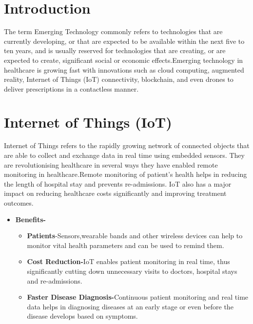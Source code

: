 \documentclass[12pt]{article}
\begin{document}
\section*{Introduction}

The term Emerging Technology commonly refers to technologies that are currently developing, or that are expected to be available within the next five to ten years, and is usually reserved for technologies that are creating, or are expected to create, significant social or economic effects.Emerging technology in healthcare is growing fast with innovations such as cloud computing, augmented reality, Internet of Things (IoT) connectivity, blockchain, and even drones to deliver prescriptions in a contactless manner.


\section{Internet of Things (IoT)}

Internet of Things refers to the rapidly growing network of connected objects that are able to collect and exchange data in real time using embedded sensors.
They are revolutionising healthcare in several ways they have enabled remote monitoring in healthcare.Remote monitoring of patient’s health helps in reducing the length of hospital stay and prevents re-admissions. IoT also has a major impact on reducing healthcare costs significantly and improving treatment outcomes.

\begin{itemize}

\item \textbf{Benefits-}
\begin{itemize}
\item \textbf{Patients}-Sensors,wearable bands and other wireless devices can help to monitor vital health parameters and can be used to remind them.
\item \textbf{Cost Reduction-}IoT enables patient monitoring in real time, thus significantly cutting down unnecessary visits to doctors, hospital stays and re-admissions.
\item \textbf{Faster Disease Diagnosis-}Continuous patient monitoring and real time data helps in diagnosing diseases at an early stage or even before the disease develops based on symptoms.

\end{itemize}

\end{itemize}
\end{document}
